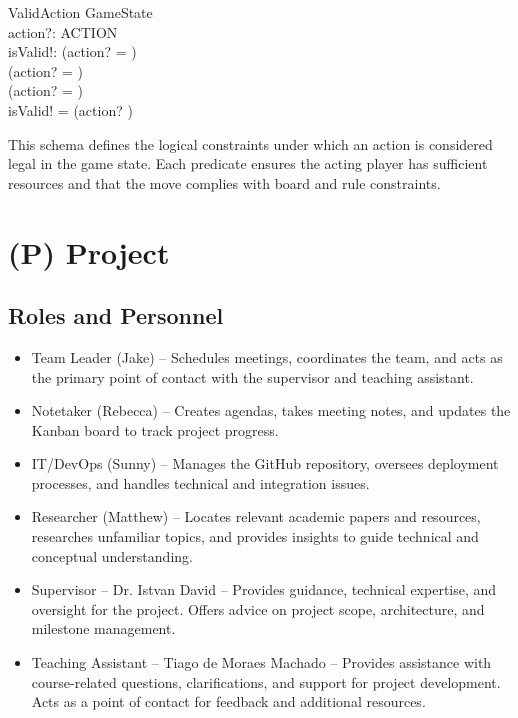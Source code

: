 \documentclass{article}
\begin{document}
\begin{schema}{ValidAction}
    GameState \\
    action?: ACTION \\
    isValid!: 
    \where
    (action? =  \implies {}) \\
    (action? =  \implies {}) \\
    (action? =  \implies {}) \\
    isValid! = (action? \in {})
\end{schema}


This schema defines the logical constraints under which an action is considered legal in the game state.
Each predicate ensures the acting player has sufficient resources and that the move complies with board and rule constraints.

\newpage{}


\section*{(P) Project}\label{sec:srs_project}
\renewcommand{\thesubsection}{P.\arabic{subsection}}
\renewcommand{\theHsubsection}{P.\arabic{subsection}}
\setcounter{subsection}{0}

\subsection{Roles and Personnel}\label{subsec:roles}
\begin{itemize}
    \item {Team Leader (Jake)} – Schedules meetings, coordinates the team, and acts as the primary point of contact with the supervisor and teaching assistant.
    \item {Notetaker (Rebecca)} – Creates agendas, takes meeting notes, and updates the Kanban board to track project progress.
    \item {IT/DevOps (Sunny)} – Manages the GitHub repository, oversees deployment processes, and handles technical and integration issues.
    \item {Researcher (Matthew)} – Locates relevant academic papers and resources, researches unfamiliar topics, and provides insights to guide technical and conceptual understanding.
    \item {Supervisor – Dr. Istvan David} – Provides guidance, technical expertise, and oversight for the project. Offers advice on project scope, architecture, and milestone management.
    \item {Teaching Assistant – Tiago de Moraes Machado} – Provides assistance with course-related questions, clarifications, and support for project development. Acts as a point of contact for feedback and additional resources.
\end{itemize}
\end{document}
